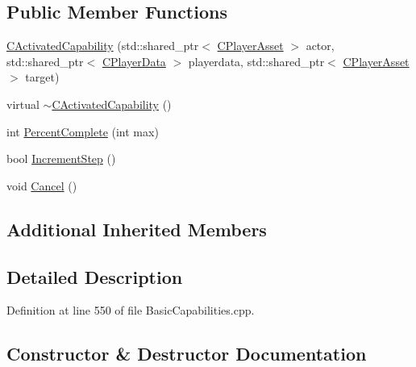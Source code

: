\subsection*{Public Member Functions}
\begin{DoxyCompactItemize}
\item 
\hyperlink{classCPlayerCapabilityPatrol_1_1CActivatedCapability_aabca66a580e5b7630f7857ad04d6198c}{C\+Activated\+Capability} (std\+::shared\+\_\+ptr$<$ \hyperlink{classCPlayerAsset}{C\+Player\+Asset} $>$ actor, std\+::shared\+\_\+ptr$<$ \hyperlink{classCPlayerData}{C\+Player\+Data} $>$ playerdata, std\+::shared\+\_\+ptr$<$ \hyperlink{classCPlayerAsset}{C\+Player\+Asset} $>$ target)
\item 
virtual \hyperlink{classCPlayerCapabilityPatrol_1_1CActivatedCapability_a2ad25677321b38e90d4e94abb0401aab}{$\sim$\+C\+Activated\+Capability} ()
\item 
int \hyperlink{classCPlayerCapabilityPatrol_1_1CActivatedCapability_a868e6583a55b01e5aa3b926ef14677bc}{Percent\+Complete} (int max)
\item 
bool \hyperlink{classCPlayerCapabilityPatrol_1_1CActivatedCapability_a576a71646225c0723a0ed9e77add01fd}{Increment\+Step} ()
\item 
void \hyperlink{classCPlayerCapabilityPatrol_1_1CActivatedCapability_a36165c232eb283ce4a92bd4606480c73}{Cancel} ()
\end{DoxyCompactItemize}
\subsection*{Additional Inherited Members}


\subsection{Detailed Description}


Definition at line 550 of file Basic\+Capabilities.\+cpp.



\subsection{Constructor \& Destructor Documentation}
\hypertarget{classCPlayerCapabilityPatrol_1_1CActivatedCapability_aabca66a580e5b7630f7857ad04d6198c}{}\label{classCPlayerCapabilityPatrol_1_1CActivatedCapability_aabca66a580e5b7630f7857ad04d6198c} 
